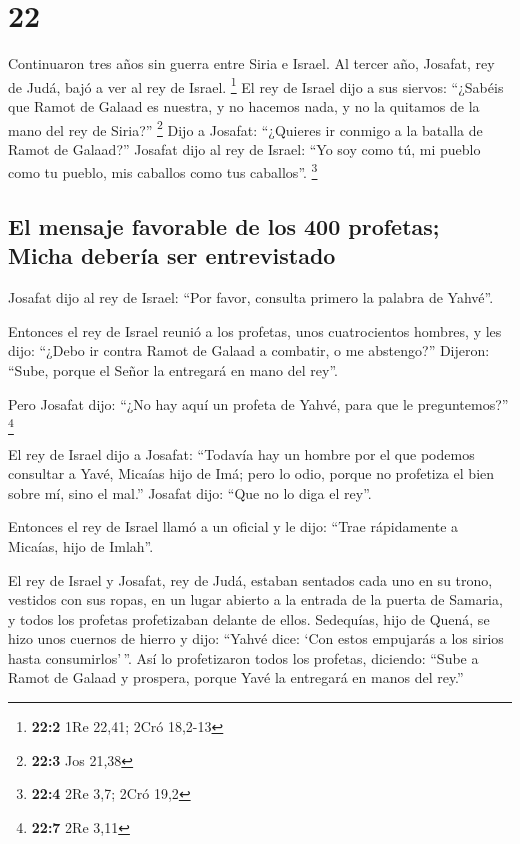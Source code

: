 \hypertarget{section-21}{%
\section{22}\label{section-21}}

 Continuaron tres años sin guerra entre Siria e Israel.
 Al tercer año, Josafat, rey de Judá, bajó a ver al rey de
Israel. \footnote{\textbf{22:2} 1Re 22,41; 2Cró 18,2-13} 
El rey de Israel dijo a sus siervos: ``¿Sabéis que Ramot de Galaad es
nuestra, y no hacemos nada, y no la quitamos de la mano del rey de
Siria?'' \footnote{\textbf{22:3} Jos 21,38}  Dijo a
Josafat: ``¿Quieres ir conmigo a la batalla de Ramot de Galaad?''
Josafat dijo al rey de Israel: ``Yo soy como tú, mi pueblo como tu
pueblo, mis caballos como tus caballos''. \footnote{\textbf{22:4} 2Re
  3,7; 2Cró 19,2}

\hypertarget{el-mensaje-favorable-de-los-400-profetas-micha-deberuxeda-ser-entrevistado}{%
\subsection{El mensaje favorable de los 400 profetas; Micha debería ser
entrevistado}\label{el-mensaje-favorable-de-los-400-profetas-micha-deberuxeda-ser-entrevistado}}

 Josafat dijo al rey de Israel: ``Por favor, consulta
primero la palabra de Yahvé''.

 Entonces el rey de Israel reunió a los profetas, unos
cuatrocientos hombres, y les dijo: ``¿Debo ir contra Ramot de Galaad a
combatir, o me abstengo?'' Dijeron: ``Sube, porque el Señor la entregará
en mano del rey''.

 Pero Josafat dijo: ``¿No hay aquí un profeta de Yahvé,
para que le preguntemos?'' \footnote{\textbf{22:7} 2Re 3,11}

 El rey de Israel dijo a Josafat: ``Todavía hay un hombre
por el que podemos consultar a Yavé, Micaías hijo de Imá; pero lo odio,
porque no profetiza el bien sobre mí, sino el mal.'' Josafat dijo: ``Que
no lo diga el rey''.

 Entonces el rey de Israel llamó a un oficial y le dijo:
``Trae rápidamente a Micaías, hijo de Imlah''.

 El rey de Israel y Josafat, rey de Judá, estaban
sentados cada uno en su trono, vestidos con sus ropas, en un lugar
abierto a la entrada de la puerta de Samaria, y todos los profetas
profetizaban delante de ellos.  Sedequías, hijo de Quená,
se hizo unos cuernos de hierro y dijo: ``Yahvé dice: `Con estos
empujarás a los sirios hasta consumirlos'\,''.  Así lo
profetizaron todos los profetas, diciendo: ``Sube a Ramot de Galaad y
prospera, porque Yavé la entregará en manos del rey.''

